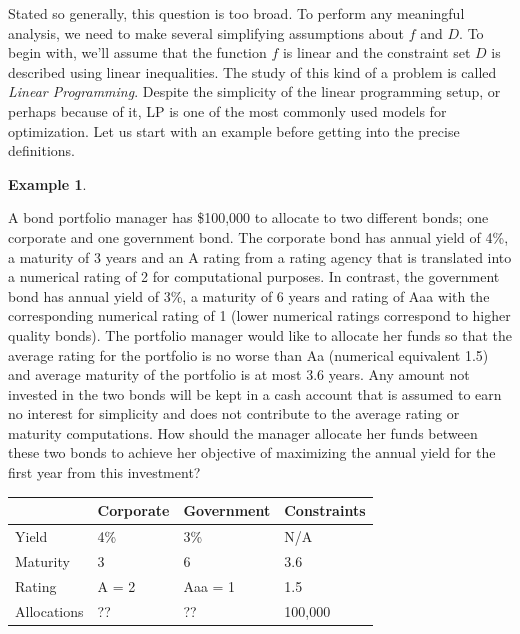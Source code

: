\documentclass[
]{book}
\theoremstyle{definition}
\theoremstyle{definition}
\newtheorem{example}{Example}[chapter]
\theoremstyle{definition}
\theoremstyle{definition}
\theoremstyle{remark}
\begin{document}
Stated so generally, this question is too broad. To perform any meaningful analysis, we need to make several simplifying assumptions about \(f\) and \(D\). To begin with, we'll assume that the function \(f\) is linear and the constraint set \(D\) is described using linear inequalities. The study of this kind of a problem is called \emph{Linear Programming}. Despite the simplicity of the linear programming setup, or perhaps because of it, LP is one of the most commonly used models for optimization. Let us start with an example before getting into the precise definitions.

\begin{example}
\protect\hypertarget{exm:bond-portfolio}{}\label{exm:bond-portfolio}

A bond portfolio manager has \$100,000 to allocate to two different bonds; one corporate and one government bond.
The corporate bond has annual yield of 4\%, a maturity of 3 years and an A rating from a rating agency that is translated into a numerical rating of 2 for computational purposes.
In contrast, the government bond has annual yield of 3\%, a maturity of 6 years and rating of Aaa with the corresponding numerical rating of 1 (lower numerical ratings correspond to higher quality bonds). The portfolio manager would like to allocate her funds so that the average rating for the portfolio is no worse than Aa (numerical equivalent 1.5) and average maturity of the portfolio is at most 3.6 years.
Any amount not invested in the two bonds will be kept in a cash account that is assumed to earn no interest for simplicity and does not contribute to the average rating or maturity computations.
How should the manager allocate her funds between these two bonds to achieve her objective of maximizing the annual yield for the first year from this investment? \citep{optimization-methods-in-finance}

\begin{longtable}[]{@{}llll@{}}
\toprule()
& Corporate & Government & Constraints \\
\midrule()
\endhead
Yield & 4\% & 3\% & N/A \\
Maturity & 3 & 6 & 3.6 \\
Rating & A = 2 & Aaa = 1 & 1.5 \\
Allocations & ?? & ?? & 100,000 \\
\bottomrule()
\end{longtable}

\end{example}
\end{document}
